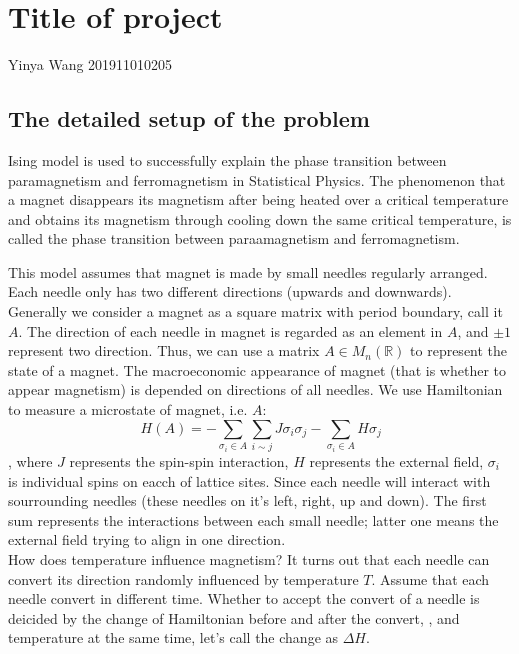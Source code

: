 \documentclass[11pt,openany]{book}              %
\begin{document}
                        
\chapter*{Title of project}
\vspace{-1cm}
{\fontsize{18.0pt}{\baselineskip}\selectfont  Yinya Wang 201911010205}

\section{The detailed setup of the problem }
Ising model is used to successfully explain 
the phase transition between paramagnetism and ferromagnetism in Statistical Physics.
The phenomenon that a magnet disappears its magnetism after being heated over a critical 
temperature and obtains its magnetism through cooling down the same critical temperature, is called
the phase transition between paraamagnetism and ferromagnetism.

This model assumes that magnet is made by small needles regularly arranged. 
Each needle only has two different directions (upwards and downwards).
Generally we consider a magnet as a square matrix with period boundary, call it \(A\). 
The direction of each needle in magnet is regarded as an element in \(A\), and \(\pm 1\) represent
two direction. Thus, we can use a matrix \(A \in M_n(\mathbb{R})\) to represent the 
state of a magnet.
The macroeconomic appearance of magnet (that is whether to appear magnetism)
is depended on directions of all needles. 
We use Hamiltonian to measure a microstate of magnet, i.e. \(A\):
\begin{equation}
\, H(A)=-\sum_{\sigma_i \in A} \sum_{i \sim j} J \sigma_i \sigma_j-\sum_{\sigma_i \in A}H \sigma_j 
\end{equation}
, where \(J\) represents the spin-spin interaction, \(H\) represents the external field, 
\(\sigma_i\) is individual spins on eacch of lattice sites.
Since each needle will interact with sourrounding needles 
(these needles on it's left, right, up and down).
The first sum represents the interactions between each small needle; 
latter one means the external field trying to align in one direction.\\

How does temperature influence magnetism? It turns out 
that each needle can convert its direction randomly influenced by temperature \(T\).
Assume that each needle convert in different time.
Whether to accept the convert of a needle is deicided by the change of Hamiltonian before and after the convert,
, and temperature at the same time, let's call the change as \(\Delta H\).
\end{document}
